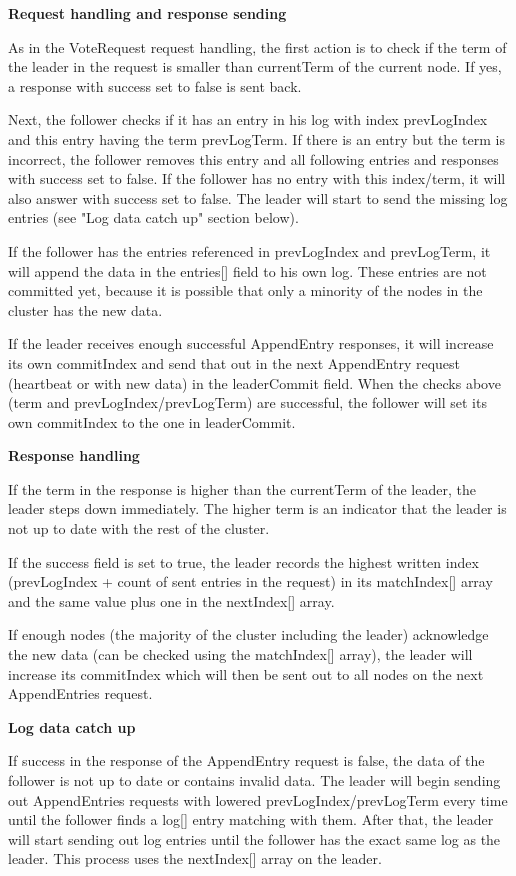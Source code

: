 \textbf{Request handling and response sending}

As in the VoteRequest request handling, the first action is to check if the term of the
leader in the request is smaller than currentTerm of the current node. If yes, a response with success
set to false is sent back.

Next, the follower checks if it has an entry in his log with index prevLogIndex and this entry having the term prevLogTerm.
If there is an entry but the term is incorrect, the follower removes this entry and all following entries and responses
with success set to false. If the follower has no entry with this index/term, it will also answer with success set to false.
The leader will start to send the missing log entries (see "Log data catch up" section below).

If the follower has the entries referenced in prevLogIndex and prevLogTerm, it will append the data in the entries[] field to his
own log. These entries are not committed yet, because it is possible that only a minority of the nodes in the cluster has the new data.

If the leader receives enough successful AppendEntry responses, it will increase its own commitIndex and send that out in the next AppendEntry request (heartbeat or with new data) in the leaderCommit field. When the checks above (term and prevLogIndex/prevLogTerm) are successful, the follower will set its own commitIndex to the one in leaderCommit.

\textbf{Response handling}

If the term in the response is higher than the currentTerm of the leader, the leader steps down immediately. The higher term
is an indicator that the leader is not up to date with the rest of the cluster.

If the success field is set to true, the leader records the highest written index (prevLogIndex + count of sent entries in the request) in its matchIndex[] array and
the same value plus one in the nextIndex[] array.

If enough nodes (the majority of the cluster including the leader) acknowledge the new data (can be checked using the matchIndex[] array), the leader will increase its commitIndex which will then be sent out to all nodes on the next AppendEntries request.

\textbf{Log data catch up}

If success in the response of the AppendEntry request is false, the data of the follower is not up to date or contains invalid data. The leader will begin sending out AppendEntries requests with lowered prevLogIndex/prevLogTerm every time until the follower finds a log[] entry matching with them. After that, the leader will start sending out log entries until the follower has the exact same log as the leader. This process uses the nextIndex[] array on the leader.





